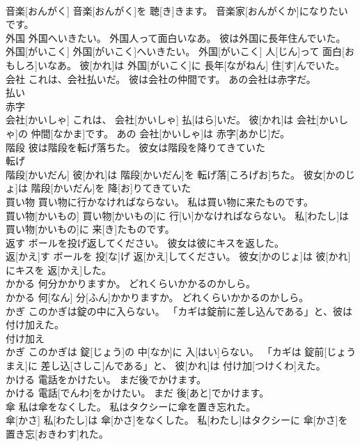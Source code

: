 \documentclass[8pt]{extreport}
\begin{document}
\begin{CJK}{UTF8}{min}
\\	音楽[おんがく] 音楽[おんがく]を 聴[き]きます。 音楽家[おんがくか]になりたいです。
\\	外国 外国へいきたい。 外国人って面白いなあ。 彼は外国に長年住んでいた。	
\\	外国[がいこく] 外国[がいこく]へいきたい。 外国[がいこく] 人[じん]って 面白[おもしろ]いなあ。 彼[かれ]は 外国[がいこく]に 長年[ながねん] 住[す]んでいた。
\\	会社 これは、会社払いだ。 彼は会社の仲間です。 あの会社は赤字だ。	
\\	払い 
\\	赤字 
\\	会社[かいしゃ] これは、 会社[かいしゃ] 払[はら]いだ。 彼[かれ]は 会社[かいしゃ]の 仲間[なかま]です。 あの 会社[かいしゃ]は 赤字[あかじ]だ。
\\	階段 彼は階段を転げ落ちた。 彼女は階段を降りてきていた	
\\	転げ 
\\	階段[かいだん] 彼[かれ]は 階段[かいだん]を 転げ落[ころげお]ちた。 彼女[かのじょ]は 階段[かいだん]を 降[お]りてきていた
\\	買い物 買い物に行かなければならない。 私は買い物に来たものです。	
\\	買い物[かいもの] 買い物[かいもの]に 行[い]かなければならない。 私[わたし]は 買い物[かいもの]に 来[き]たものです。
\\	返す ボールを投げ返してください。 彼女は彼にキスを返した。	
\\	返[かえ]す ボールを 投[な]げ 返[かえ]してください。 彼女[かのじょ]は 彼[かれ]にキスを 返[かえ]した。
\\	かかる 何分かかりますか。 どれくらいかかるのかしら。	
\\	かかる 何[なん] 分[ふん]かかりますか。 どれくらいかかるのかしら。
\\	かぎ このかぎは錠の中に入らない。 「カギは錠前に差し込んである」と、彼は付け加えた。	
\\	付け加え 
\\	かぎ このかぎは 錠[じょう]の 中[なか]に 入[はい]らない。 「カギは 錠前[じょうまえ]に 差し込[さしこ]んである」と、 彼[かれ]は 付け加[つけくわ]えた。
\\	かける 電話をかけたい。 まだ後でかけます。	
\\	かける 電話[でんわ]をかけたい。 まだ 後[あと]でかけます。
\\	傘 私は傘をなくした。 私はタクシーに傘を置き忘れた。	
\\	傘[かさ] 私[わたし]は 傘[かさ]をなくした。 私[わたし]はタクシーに 傘[かさ]を 置き忘[おきわす]れた。

\end{CJK}
\end{document}
